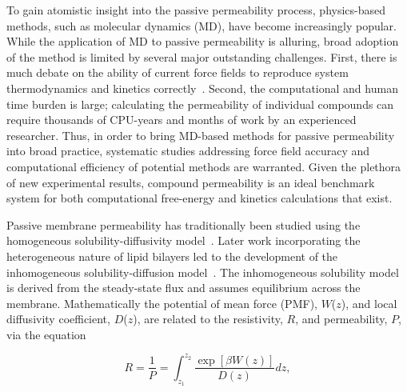 \par To gain atomistic insight into the passive permeability process, physics-based methods, such as molecular dynamics (MD), have become increasingly popular. While the application of MD to passive permeability is alluring, broad adoption of the method is limited by several major outstanding challenges. First, there is much debate on the ability of current force fields to reproduce system thermodynamics and kinetics correctly~\cite{Paloncyova2014,Wang2015,Vitalini2015}. Second, the computational and human time burden is large; calculating the permeability of individual compounds can require thousands of CPU-years and months of work by an experienced researcher. Thus, in order to bring MD-based methods for passive permeability into broad practice, systematic studies addressing force field accuracy and computational efficiency of potential methods are warranted. Given the plethora of new experimental results, compound permeability is an ideal benchmark system for both computational free-energy and kinetics calculations that exist.

\par Passive membrane permeability has traditionally been studied using the homogeneous solubility-diffusivity model~\cite{Finkelstein1968}. Later work incorporating the heterogeneous nature of lipid bilayers led to the development of the inhomogeneous solubility-diffusion model~\cite{Diamond1974,Marrink1994}. The inhomogeneous solubility model is derived from the steady-state flux and assumes equilibrium across the membrane. Mathematically the potential of mean force (PMF), $W$($z$), and local diffusivity coefficient, $D$($z$), are related to the resistivity, $R$, and permeability, $P$, via the equation

\begin{equation}
R = \frac{1}{P} = \int_{z_1}^{z_2} \frac{\exp[\beta W(z)]}{D(z)}dz,
\label{eq:solubility-diffusion}
\end{equation}

